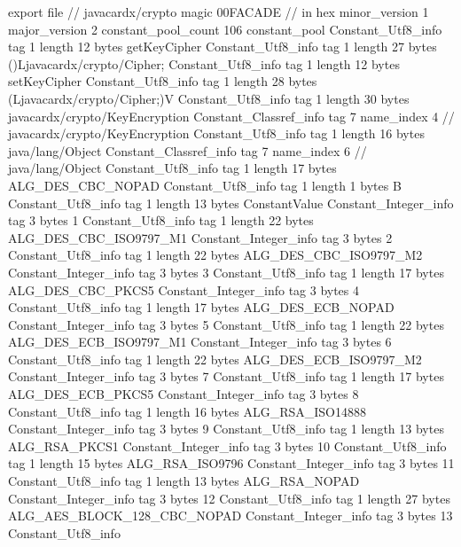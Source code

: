 export file {		// javacardx/crypto
	magic	00FACADE		 // in hex
	minor_version	1
	major_version	2
	constant_pool_count	106
	constant_pool {
		Constant_Utf8_info {
			tag	1
			length	12
			bytes	getKeyCipher
		}
		Constant_Utf8_info {
			tag	1
			length	27
			bytes	()Ljavacardx/crypto/Cipher;
		}
		Constant_Utf8_info {
			tag	1
			length	12
			bytes	setKeyCipher
		}
		Constant_Utf8_info {
			tag	1
			length	28
			bytes	(Ljavacardx/crypto/Cipher;)V
		}
		Constant_Utf8_info {
			tag	1
			length	30
			bytes	javacardx/crypto/KeyEncryption
		}
		Constant_Classref_info {
			tag	7
			name_index	4		// javacardx/crypto/KeyEncryption
		}
		Constant_Utf8_info {
			tag	1
			length	16
			bytes	java/lang/Object
		}
		Constant_Classref_info {
			tag	7
			name_index	6		// java/lang/Object
		}
		Constant_Utf8_info {
			tag	1
			length	17
			bytes	ALG_DES_CBC_NOPAD
		}
		Constant_Utf8_info {
			tag	1
			length	1
			bytes	B
		}
		Constant_Utf8_info {
			tag	1
			length	13
			bytes	ConstantValue
		}
		Constant_Integer_info {
			tag	3
			bytes	1
		}
		Constant_Utf8_info {
			tag	1
			length	22
			bytes	ALG_DES_CBC_ISO9797_M1
		}
		Constant_Integer_info {
			tag	3
			bytes	2
		}
		Constant_Utf8_info {
			tag	1
			length	22
			bytes	ALG_DES_CBC_ISO9797_M2
		}
		Constant_Integer_info {
			tag	3
			bytes	3
		}
		Constant_Utf8_info {
			tag	1
			length	17
			bytes	ALG_DES_CBC_PKCS5
		}
		Constant_Integer_info {
			tag	3
			bytes	4
		}
		Constant_Utf8_info {
			tag	1
			length	17
			bytes	ALG_DES_ECB_NOPAD
		}
		Constant_Integer_info {
			tag	3
			bytes	5
		}
		Constant_Utf8_info {
			tag	1
			length	22
			bytes	ALG_DES_ECB_ISO9797_M1
		}
		Constant_Integer_info {
			tag	3
			bytes	6
		}
		Constant_Utf8_info {
			tag	1
			length	22
			bytes	ALG_DES_ECB_ISO9797_M2
		}
		Constant_Integer_info {
			tag	3
			bytes	7
		}
		Constant_Utf8_info {
			tag	1
			length	17
			bytes	ALG_DES_ECB_PKCS5
		}
		Constant_Integer_info {
			tag	3
			bytes	8
		}
		Constant_Utf8_info {
			tag	1
			length	16
			bytes	ALG_RSA_ISO14888
		}
		Constant_Integer_info {
			tag	3
			bytes	9
		}
		Constant_Utf8_info {
			tag	1
			length	13
			bytes	ALG_RSA_PKCS1
		}
		Constant_Integer_info {
			tag	3
			bytes	10
		}
		Constant_Utf8_info {
			tag	1
			length	15
			bytes	ALG_RSA_ISO9796
		}
		Constant_Integer_info {
			tag	3
			bytes	11
		}
		Constant_Utf8_info {
			tag	1
			length	13
			bytes	ALG_RSA_NOPAD
		}
		Constant_Integer_info {
			tag	3
			bytes	12
		}
		Constant_Utf8_info {
			tag	1
			length	27
			bytes	ALG_AES_BLOCK_128_CBC_NOPAD
		}
		Constant_Integer_info {
			tag	3
			bytes	13
		}
		Constant_Utf8_info {
}}}
